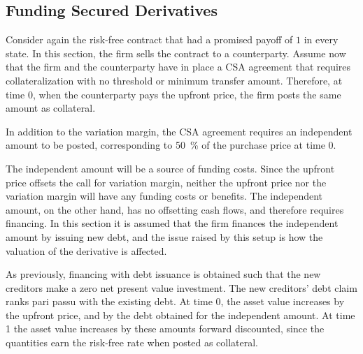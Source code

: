 \documentclass[../main.tex]{subfiles}
\begin{document}
    \subsection{Funding Secured Derivatives}
    \label{sec:example-secured-derivative}
        Consider again the risk-free contract that had a promised payoff of $1$ in every state.
        In this section, the firm sells the contract to a counterparty.
        Assume now that the firm and the counterparty have in place a CSA agreement
        that requires collateralization with no threshold or minimum transfer amount.
        Therefore, at time 0, when the counterparty pays the upfront price,
        the firm posts the same amount as collateral.

        In addition to the variation margin, 
        the CSA agreement requires an independent amount to be posted,
        corresponding to \qty[round-precision=0]{50}{\percent} of the purchase price at time 0.

        The independent amount will be a source of funding costs.
        Since the upfront price offsets the call for variation margin,
        neither the upfront price nor the variation margin will have any funding costs or benefits.
        The independent amount, on the other hand, has no offsetting cash flows, 
        and therefore requires financing.
        In this section it is assumed that the firm finances the independent amount by issuing new debt,
        and the issue raised by this setup is how the valuation of the derivative is affected.
        

        As previously, financing with debt issuance is obtained 
        such that the new creditors make a zero net present value investment.
        The new creditors' debt claim ranks pari passu with the existing debt.
        At time 0, the asset value increases by the upfront price,
        and by the debt obtained for the independent amount.
        At time 1 the asset value increases by these amounts forward discounted,
        since the quantities earn the risk-free rate when posted as collateral.
\end{document}
